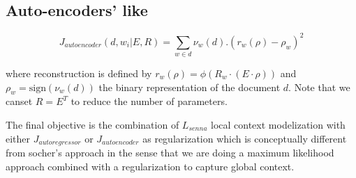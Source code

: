 \documentclass[11pt]{article} %
\begin{document}
\subsection{Auto-encoders' like}
\[
J_{autoencoder} (d,w_i| E,R) = \sum_{w\in d} \nu_w\left(d\right) . \left( r_w \left( \rho \right) - \rho_w \right)^2 
\]

where reconstruction is defined by $r_w(\rho) = \phi\left(R_w\cdot\left(E\cdot\rho\right)\right)$ and $\rho_w = \mathrm{sign}\left(\nu_w\left(d\right)\right)$ the binary representation of the document $d$. Note that we canset $R=E^T$ to reduce the number of parameters.

The final objective is the combination of $L_{senna} $ local context modelization with either $J_{autoregressor}$ or $J_{autoencoder}$ as regularization which is conceptually different from socher's approach in the sense that we are doing a maximum likelihood approach combined with a regularization to capture global context.
\end{document}
